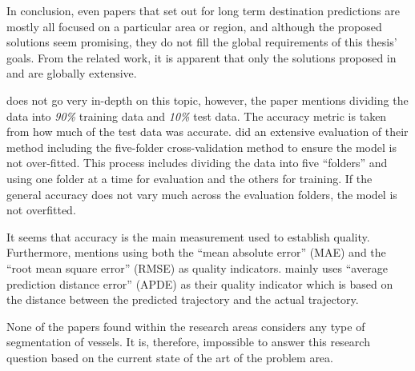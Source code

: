 In conclusion, even papers that set out for long term destination predictions are mostly all focused on a particular area or region, and although the proposed solutions seem promising, they do not fill the global requirements of this thesis' goals. From the related work, it is apparent that only the solutions proposed in \cite{lechtenberg2019} and \cite{Zhang2020AISApproach} are globally extensive.



\cite{lechtenberg2019} does not go very in-depth on this topic, however, the paper mentions dividing the data into \textit{90\%} training data and \textit{10\%} test data. The accuracy metric is taken from how much of the test data was accurate. \cite{Zhang2020AISApproach} did an extensive evaluation of their method including the five-folder cross-validation method to ensure the model is not over-fitted. This process includes dividing the data into five “folders” and using one folder at a time for evaluation and the others for training. If the general accuracy does not vary much across the evaluation folders, the model is not overfitted.


It seems that accuracy is the main measurement used to establish quality. Furthermore, \cite{lechtenberg2019} mentions using both the “mean absolute error” (MAE) and the “root mean square error” (RMSE) as quality indicators. \cite{Zhang2020AISApproach} mainly uses “average prediction distance error” (APDE) as their quality indicator which is based on the distance between the predicted trajectory and the actual trajectory.


None of the papers found within the research areas considers any type of segmentation of vessels. It is, therefore, impossible to answer this research question based on the current state of the art of the problem area.


